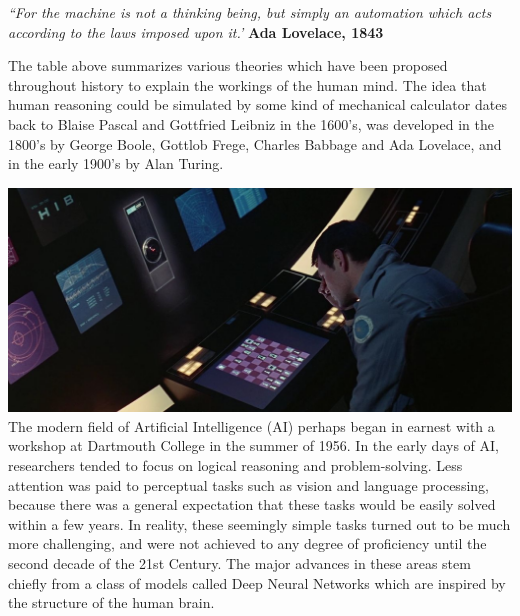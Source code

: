\documentclass[11pt]{article}
\begin{document}
\begin{displayquote}
\emph{``For the machine is not a thinking being, but simply an automation which acts
according to the laws imposed upon it.'}
\textbf{Ada Lovelace, 1843}
\end{displayquote}

The table above summarizes various theories which have been proposed throughout history to explain the workings of the human mind.
The idea that human reasoning could be simulated by some kind of mechanical calculator dates back to Blaise Pascal and Gottfried Leibniz in the 1600's, was developed in the 1800's by George Boole, Gottlob Frege, Charles Babbage and Ada Lovelace, and in the early 1900's by Alan Turing.

\includegraphics[width=\textwidth]{images/img_1}
The modern field of Artificial Intelligence (AI) perhaps began in earnest with a workshop at Dartmouth College in the summer of 1956.
In the early days of AI, researchers tended to focus on logical reasoning and problem-solving.
Less attention was paid to perceptual tasks such as vision and language processing, because there was a general expectation that these tasks would be easily solved within a few years.
In reality, these seemingly simple tasks turned out to be much more challenging, and were not achieved to any degree of proficiency until the second decade of the 21st Century.
The major advances in these areas stem chiefly from a class of models called Deep Neural Networks which are inspired by the structure of the human brain.
\end{document}
